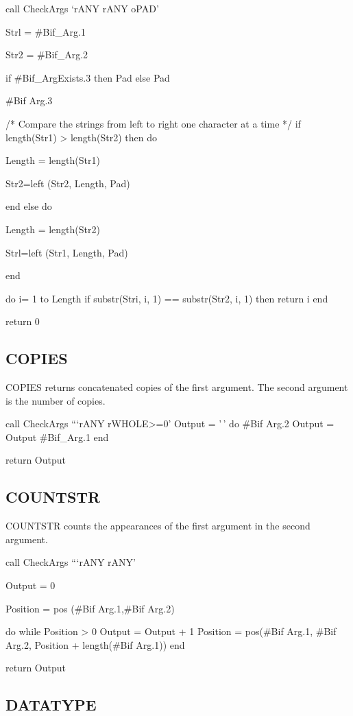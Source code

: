call CheckArgs `rANY rANY oPAD'

Strl = \#Bif\_Arg.1

Str2 = \#Bif\_Arg.2

if \#Bif\_ArgExists.3 then Pad else Pad

\#Bif Arg.3

/* Compare the strings from left to right one character at a time */ if
length(Str1) \textgreater{} length(Str2) then do

Length = length(Str1)

Str2=left (Str2, Length, Pad)

end else do

Length = length(Str2)

Strl=left (Str1, Length, Pad)

end

do i= 1 to Length if substr(Stri, i, 1) == substr(Str2, i, 1) then
return i end

return 0

\subsection{COPIES}\label{copies}

COPIES returns concatenated copies of the first argument. The second
argument is the number of copies.

call CheckArgs ```rANY rWHOLE\textgreater=0' Output = '\,' do \#Bif
Arg.2 Output = Output \textbar\textbar{} \#Bif\_Arg.1 end

return Output

\subsection{COUNTSTR}\label{countstr}

COUNTSTR counts the appearances of the first argument in the second
argument.

call CheckArgs ```rANY rANY'

Output = 0

Position = pos (\#Bif Arg.1,\#Bif Arg.2)

do while Position \textgreater{} 0 Output = Output + 1 Position =
pos(\#Bif Arg.1, \#Bif Arg.2, Position + length(\#Bif Arg.1)) end

return Output

\subsection{DATATYPE}\label{datatype}

